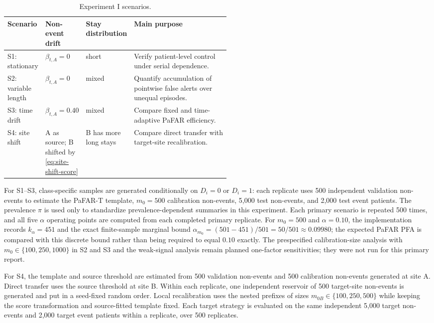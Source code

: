 \documentclass[11pt]{article}
\begin{document}
\begin{table}[!htbp]
\centering
\caption{Experiment I scenarios.}
\label{tab:score-scenarios}
\begin{tabularx}{\linewidth}{@{}L{0.16\linewidth}L{0.18\linewidth}L{0.18\linewidth}Y@{}}
\toprule
Scenario & Non-event drift & Stay distribution & Main purpose \\
\midrule
S1: stationary & $\beta_{t,A}=0$ & short & Verify patient-level control under serial dependence. \\
S2: variable length & $\beta_{t,A}=0$ & mixed & Quantify accumulation of pointwise false alerts over unequal episodes. \\
S3: time drift & $\beta_{t,A}=0.40$ & mixed & Compare fixed and time-adaptive PaFAR efficiency. \\
S4: site shift & A as source; B shifted by \eqref{eq:site-shift-score} & B has more long stays & Compare direct transfer with target-site recalibration. \\
\bottomrule
\end{tabularx}
\end{table}

For S1--S3, class-specific samples are generated conditionally on $D_i=0$ or $D_i=1$: each replicate uses 500 independent validation non-events to estimate the PaFAR-T template, $m_0=500$ calibration non-events, 5,000 test non-events, and 2,000 test event patients. The prevalence $\pi$ is used only to standardize prevalence-dependent summaries in this experiment. Each primary scenario is repeated 500 times, and all five $\alpha$ operating points are computed from each completed primary replicate. For $m_0=500$ and $\alpha=0.10$, the implementation records $k_{\alpha}=451$ and the exact finite-sample marginal bound $\alpha_{m_0}=(501-451)/501=50/501\approx0.09980$; the expected PaFAR PFA is compared with this discrete bound rather than being required to equal $0.10$ exactly. The prespecified calibration-size analysis with $m_0\in\{100,250,1000\}$ in S2 and S3 and the weak-signal analysis remain planned one-factor sensitivities; they were not run for this primary report.

For S4, the template and source threshold are estimated from 500 validation non-events and 500 calibration non-events generated at site A. Direct transfer uses the source threshold at site B. Within each replicate, one independent reservoir of 500 target-site non-events is generated and put in a seed-fixed random order. Local recalibration uses the nested prefixes of sizes $m_{0B}\in\{100,250,500\}$ while keeping the score transformation and source-fitted template fixed. Each target strategy is evaluated on the same independent 5,000 target non-events and 2,000 target event patients within a replicate, over 500 replicates.
\end{document}
